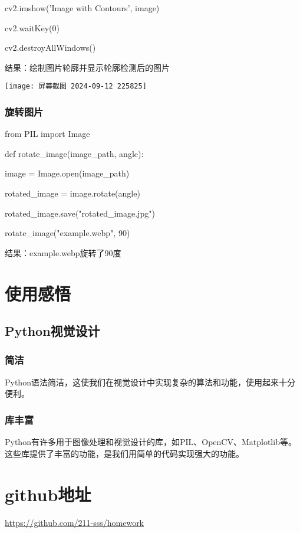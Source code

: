 \documentclass{ctexart}
\begin{document}
cv2.imshow('Image with Contours', image)

cv2.waitKey(0)

cv2.destroyAllWindows()

结果：绘制图片轮廓并显示轮廓检测后的图片

\texttt{[image: 屏幕截图 2024-09-12 225825]}
\subsubsection{旋转图片}
from PIL import Image

def rotate_image(image_path, angle):

    image = Image.open(image_path)
    
    rotated_image = image.rotate(angle)
    
    rotated_image.save("rotated_image.jpg")

rotate_image("example.webp", 90)

结果：example.webp旋转了90度
\
\
\section{使用感悟}
\subsection{Python视觉设计 }
\subsubsection{简洁}
Python语法简洁，这使我们在视觉设计中实现复杂的算法和功能，使用起来十分便利。 
\subsubsection{库丰富}
Python有许多用于图像处理和视觉设计的库，如PIL、OpenCV、Matplotlib等。这些库提供了丰富的功能，是我们用简单的代码实现强大的功能。  
\section{github地址}
\url{https://github.com/211-sss/homework}
\end{document}
